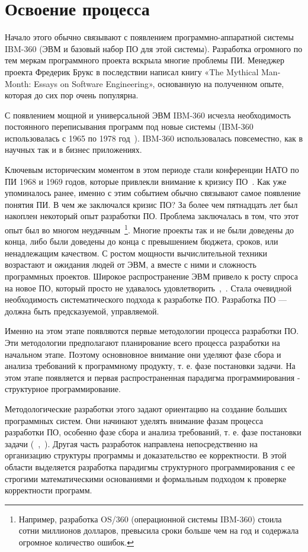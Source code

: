 \section{Освоение процесса}

Начало этого обычно связывают с появлением программно-аппаратной системы IBM-360 (ЭВМ и базовый набор ПО для этой системы). Разработка огромного по тем меркам программного проекта вскрыла многие проблемы ПИ. Менеджер проекта Фредерик Брукс в последствии написал книгу «The Mythical Man-Month: Essays on Software Engineering», основанную на полученном опыте, которая до сих пор очень популярна.

С появлением мощной и универсальной ЭВМ IBM-360 исчезла необходимость постоянного переписывания программ под новые системы (IBM-360 использовалась с 1965 по 1978 год~\cite{IBM360}). IBM-360 использовалась повсеместно, как в научных так и в бизнес приложениях.

Ключевым историческим моментом в этом периоде стали конференции НАТО по ПИ 1968 и 1969 годов, которые привлекли внимание к кризису ПО~\cite{CRISIS}. Как уже упоминалось ранее, именно с этим событием обычно связывают самое появление понятия ПИ. В чем же заключался кризис ПО?  За более чем пятнадцать лет был накоплен некоторый опыт разработки ПО. Проблема заключалась в том, что этот опыт был во многом неудачным~\footnote{Например, разработка OS/360 (операционной системы IBM-360) стоила сотни миллионов долларов, превысила сроки больше чем на год и содержала огромное количество ошибок.}. Многие проекты так и не были доведены до конца, либо были доведены до конца с превышением бюджета, сроков, или ненадлежащим качеством. С ростом мощности вычислительной техники возрастают и ожидания людей от ЭВМ, а вместе с ними и сложность программных проектов. Широкое распространение ЭВМ привело к росту спроса на новое ПО, который просто не удавалось удовлетворить~\cite{Dijkstra:1972:HP},~\cite{CRISIS}. Стала очевидной необходимость систематического подхода к разработке ПО. Разработка ПО — должна быть предсказуемой, управляемой.

Именно на этом этапе появляются первые методологии процесса разработки ПО. Эти методологии предполагают планирование всего процесса разработки на начальном этапе. Поэтому основновное внимание они уделяют фазе сбора и анализа требований к программному продукту, т. е. фазе постановки задачи. На этом этапе появляется и первая распространенная парадигма программирования - структурное программирование.

Методологические разработки этого задают ориентацию на создание больших программных систем. Они начинают уделять внимание фазам процесса разработки ПО, особенно фазе сбора и анализа требований, т. е. фазе постановки задачи (~\cite{Alford:1976:REM},~\cite{Ross:1977:SA}). Другая часть разработок направлена непосредственно на организацию структуры программы и доказательство ее корректности. В этой области выделяется разработка парадигмы структурного программирования с ее строгими математическими основаниями и формальным подходом к проверке корректности программ.

